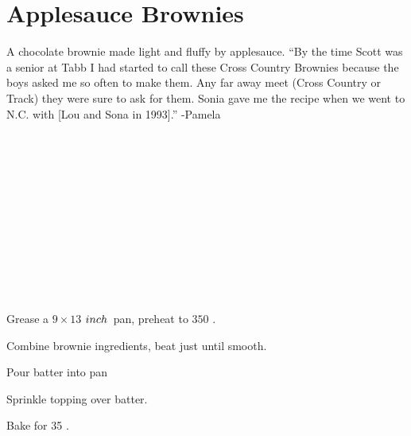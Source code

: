 \section[Applesauce Brownies]{Applesauce Brownies}


\begin{recipestats}[
	servings=16,
	preptime=15~\minute,
	bakingtime=35~\minute,
	source=Pam \& Sonia,
]
\end{recipestats}


\begin{recipeabstract}
	A chocolate brownie made light and fluffy by applesauce.
	``By the time Scott was a senior at Tabb I had started to call these Cross Country Brownies because the boys asked me so often to make them.
	Any far away meet (Cross Country or Track) they were sure to ask for them.
	Sonia gave me the recipe when we went to N.C. with [Lou and Sona in 1993].'' -Pamela
\end{recipeabstract}


\begin{ingredientcolumns}
	\begin{ingredientblock}[brownie]
		\\
		\\
		\\
		\\
		\\
		\\
		\\
		\\
	\end{ingredientblock}
	\begin{ingredientblock}[topping]
		\\
		\\
	\end{ingredientblock}
\end{ingredientcolumns}


\pagebreak[1] %
\begin{preparation}
\item Grease a $9\times13$ $inch$~pan, preheat to $350$ \Fahrenheit.
\item Combine brownie ingredients, beat just until smooth.
\item Pour batter into pan
\item Sprinkle topping over batter.
\item Bake for 35 \minute.
\end{preparation}


\recipeend%
